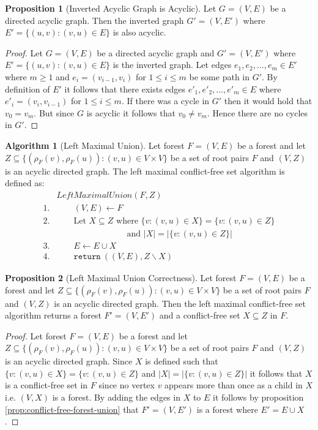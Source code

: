 \documentclass[a4paper,12pt]{article}
\theoremstyle{definition}
\newtheorem{proposition}{Proposition}[section]
\newtheorem{algorithm}{Algorithm}[section]
\newcommand{\id}[1]{\ensuremath{\mathit{#1}}}
\newcommand{\kw}[1]{\ensuremath{\mathtt{#1}}}
\begin{document}
\begin{proposition}[Inverted Acyclic Graph is Acyclic]
    Let $G = (V, E)$ be a directed acyclic graph. Then the inverted graph $G' =
    (V, E')$ where $E' = \{(u, v) : (v, u) \in E\}$ is also acyclic.
\end{proposition}
\begin{proof}
    Let $G = (V, E)$ be a directed acyclic graph and $G' = (V, E')$ where $E' =
    \{(u, v) : (v, u) \in E\}$ is the inverted graph. Let edges $e_1, e_2,
    \ldots, e_m \in E'$ where $m \geq 1$ and $e_i = (v_{i-1}, v_i)$ for $1 \leq
    i \leq m$ be some path in $G'$. By definition of $E'$ it follows that there
    exists edges $e'_1, e'_2, \ldots, e'_m \in E$ where $e'_i = (v_i, v_{i-1})$
    for $1 \leq i \leq m$. If there was a cycle in $G'$ then it would hold that
    $v_0 = v_m$. But since $G$ is acyclic it follows that $v_0 \neq v_m$. Hence
    there are no cycles in $G'$.  
\end{proof}

\begin{algorithm}[Left Maximal Union]
    Let forest $F = (V, E)$ be a forest and let $Z \subseteq \{(\rho_F(v),
    \rho_F(u)) : (v, u) \in V \times V\}$ be a set of root pairs $F$ and $(V,
    Z)$ is an acyclic directed graph. The left maximal conflict-free set
    algorithm is defined as:
    \begin{align*}
        & \id{LeftMaximalUnion}(F, Z) \\ 
        1. & \qquad (V, E) \leftarrow F \\
        2. & \qquad \text{Let } X \subseteq Z \text{ where } \{v : (v, u) \in X\} = \{v : (v, u) \in Z\} \\
        & \qquad \qquad \qquad \quad \: \: \: 
        \: \text{ and } |X| = |\{v : (v, u) \in Z\}| \\
        3. & \qquad E \leftarrow E \cup X \\
        4. & \qquad \kw{return} \: ((V, E), Z \backslash X)
    \end{align*}
\end{algorithm}
\begin{proposition}[Left Maximal Union Correctness]
    Let forest $F = (V, E)$ be a forest and let $Z \subseteq \{(\rho_F(v),
    \rho_F(u)) : (v, u) \in V \times V\}$ be a set of root pairs $F$ and $(V,
    Z)$ is an acyclic directed graph. Then the left maximal conflict-free set
    algorithm returns a forest $F' = (V, E')$ and a conflict-free set $X
    \subseteq Z$ in $F$.
\end{proposition}
\begin{proof}
    Let forest $F = (V, E)$ be a forest and let $Z \subseteq \{(\rho_F(v),
    \rho_F(u)) : (v, u) \in V \times V\}$ be a set of root pairs $F$ and $(V,
    Z)$ is an acyclic directed graph. Since $X$ is defined such that $\{v : (v,
    u) \in X\} = \{v : (v, u) \in Z\}$ and $|X| = |\{v : (v, u) \in Z\}|$ it
    follows that $X$ is a conflict-free set in $F$ since no vertex $v$ appears
    more than once as a child in $X$ i.e. $(V, X)$ is a forest. By adding the
    edges in $X$ to $E$ it follows by proposition
    \ref{prop:conflict-free-forest-union} that $F' = (V, E')$ is a forest where
    $E' = E \cup X$.
\end{proof}
\end{document}
